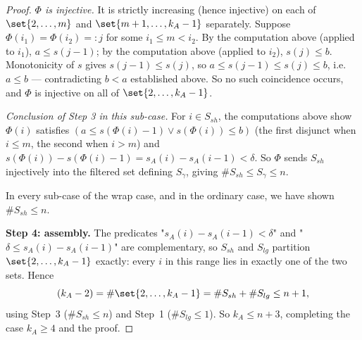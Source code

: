 \begin{proof}
  \emph{$\Phi$ is injective.} It is strictly increasing (hence injective) on each of
  $\set{2,\dots,m}$ and $\set{m+1,\dots,k_A-1}$ separately. Suppose $\Phi(i_1)=\Phi(i_2)=:j$ for
  some $i_1\le m<i_2$. By the computation above (applied to $i_1$), $a\le s(j-1)$; by the
  computation above (applied to $i_2$), $s(j)\le b$. Monotonicity of $s$ gives $s(j-1)\le s(j)$, so
  $a\le s(j-1)\le s(j)\le b$, i.e.\ $a\le b$ — contradicting $b<a$ established above. So no such
  coincidence occurs, and $\Phi$ is injective on all of $\set{2,\dots,k_A-1}$.

  \emph{Conclusion of Step 3 in this sub-case.} For $i\in S_{sh}$, the computations above show
  $\Phi(i)$ satisfies $(a\le s(\Phi(i)-1)\vee s(\Phi(i))\le b)$ (the first disjunct when $i\le m$,
  the second when $i>m$) and $s(\Phi(i))-s(\Phi(i)-1)=s_A(i)-s_A(i-1)<\delta$. So $\Phi$ sends
  $S_{sh}$ injectively into the filtered set defining $S_\gamma$, giving $\#S_{sh}\le S_\gamma\le n$.

  In every sub-case of the wrap case, and in the ordinary case, we have shown $\#S_{sh}\le n$.

  \textbf{Step 4: assembly.} The predicates "$s_A(i)-s_A(i-1)<\delta$" and
  "$\delta\le s_A(i)-s_A(i-1)$" are complementary, so $S_{sh}$ and $S_{lg}$ partition
  $\set{2,\dots,k_A-1}$ exactly: every $i$ in this range lies in exactly one of the two sets. Hence
  \[
    (k_A-2) = \#\set{2,\dots,k_A-1} = \#S_{sh}+\#S_{lg} \le n+1
    ,
  \]
  using Step~3 ($\#S_{sh}\le n$) and Step~1 ($\#S_{lg}\le1$). So $k_A\le n+3$, completing the case
  $k_A\ge4$ and the proof.
\end{proof}
